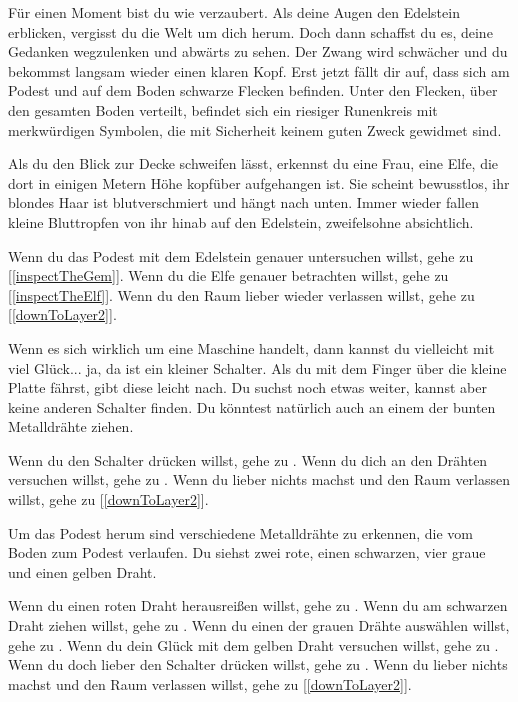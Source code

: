 Für einen Moment bist du wie verzaubert. Als deine Augen den Edelstein erblicken, vergisst du die Welt um dich herum. Doch dann schaffst du es, deine Gedanken wegzulenken und abwärts zu sehen. Der Zwang wird schwächer und du bekommst langsam wieder einen klaren Kopf. Erst jetzt fällt dir auf, dass sich am Podest und auf dem Boden schwarze Flecken befinden. Unter den Flecken, über den gesamten Boden verteilt, befindet sich ein riesiger Runenkreis mit merkwürdigen Symbolen, die mit Sicherheit keinem guten Zweck gewidmet sind.

Als du den Blick zur Decke schweifen lässt, erkennst du eine Frau, eine Elfe, die dort in einigen Metern Höhe kopfüber aufgehangen ist. Sie scheint bewusstlos, ihr blondes Haar ist blutverschmiert und hängt nach unten. Immer wieder fallen kleine Bluttropfen von ihr hinab auf den Edelstein, zweifelsohne absichtlich.

Wenn du das Podest mit dem Edelstein genauer untersuchen willst, gehe zu [\ref{inspectTheGem}].
Wenn du die Elfe genauer betrachten willst, gehe zu [\ref{inspectTheElf}].
Wenn du den Raum lieber wieder verlassen willst, gehe zu [\ref{downToLayer2}].


Wenn es sich wirklich um eine Maschine handelt, dann kannst du vielleicht mit viel Glück... ja, da ist ein kleiner Schalter. Als du mit dem Finger über die kleine Platte fährst, gibt diese leicht nach. Du suchst noch etwas weiter, kannst aber keine anderen Schalter finden. Du könntest natürlich auch an einem der bunten Metalldrähte ziehen.

Wenn du den Schalter drücken willst, gehe zu .
Wenn du dich an den Drähten versuchen willst, gehe zu .
Wenn du lieber nichts machst und den Raum verlassen willst, gehe zu [\ref{downToLayer2}].


Um das Podest herum sind verschiedene Metalldrähte zu erkennen, die vom Boden zum Podest verlaufen. Du siehst zwei rote, einen schwarzen, vier graue und einen gelben Draht.

Wenn du einen roten Draht herausreißen willst, gehe zu .
Wenn du am schwarzen Draht ziehen willst, gehe zu .
Wenn du einen der grauen Drähte auswählen willst, gehe zu .
Wenn du dein Glück mit dem gelben Draht versuchen willst, gehe zu .
Wenn du doch lieber den Schalter drücken willst, gehe zu .
Wenn du lieber nichts machst und den Raum verlassen willst, gehe zu [\ref{downToLayer2}].

